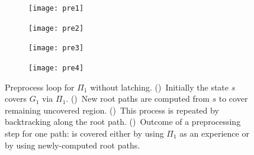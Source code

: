 \documentclass[a4paper]{report}
\begin{document}
\begin{figure}[t]
    \centering
    \begin{subfigure}{.48\textwidth}
        \texttt{[image: pre1]}
        \caption{}
        \label{fig:pre1}
    \end{subfigure}
    \begin{subfigure}{.48\textwidth}
        \texttt{[image: pre2]}
        \caption{}
        \label{fig:pre2}
    \end{subfigure} 
    \begin{subfigure}{.48\textwidth}
        \texttt{[image: pre3]}
        \caption{}
        \label{fig:pre3}
    \end{subfigure}
    \begin{subfigure}{.48\textwidth}
        \texttt{[image: pre4]}
        \caption{}
        \label{fig:pre4}
    \end{subfigure}
    \caption{\CaptionTextSize
    Preprocess loop for $\Pi_1$ without latching.
    ()~Initially the state $s$ covers $G_1$ via $\Pi_1$. 
    ()~New root paths are computed from $s$ to cover remaining uncovered region.
    ()~This process is repeated by backtracking along the root path.
    ()~Outcome of a preprocessing step for one path: \Gfull is covered either by using $\Pi_1$ as an experience or by 
    using newly-computed root paths. 
    }
    \label{fig:pl_no_latching}
\end{figure}
\end{document}
